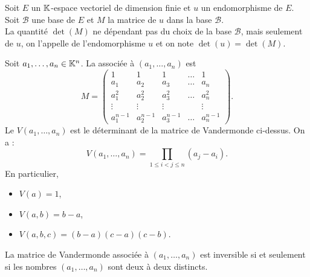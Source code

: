 \documentclass{book}
\begin{document}
\begin{Definition}
Soit $E$ un $\mathbb{K} $-espace vectoriel de dimension finie et $u$ un endomorphisme de $E$.\\
Soit $\mathcal{B}$ une base de $E$ et $M$ la matrice de $u$ dans la base $\mathcal{B}$.\\
La quantité $\det(M)$ ne dépendant pas du choix de la base $\mathcal{B}$, mais seulement de $u$, on l'appelle  de l'endomorphisme $u$ et on note $\det(u) = \det(M)$.
\end{Definition}
\begin{Exemple}

Soit $a_1,\dots,a_n \in  \mathbb{K} ^n$.
La  associée à $(a_1,\dots,a_n)$ est
\[ M = \begin{pmatrix}
    1 &  1 &  1 &  \dots &  1  \\
    a_1 &  a_2 &  a_3 &  \dots &  a_n  \\
    a_1^2 &  a_2^2 &  a_3^2 &  \dots &  a_n^2  \\
    \vdots &  \vdots &  \vdots &   &  \vdots  \\
a_1^{n-1} &  a_2^{n-1} &  a_3^{n-1} &  \dots &  a_n^{n-1}  \end{pmatrix}. \]
Le  $V(a_1,\dots,a_n)$ est le déterminant de la matrice de Vandermonde ci-dessus. On a :
$$V(a_1,\dots,a_n) = \prod_{1\leq i < j\leq n} (a_j - a_i). $$
En particulier,
\begin{itemize}
\item $V(a) = 1$,
\item $V(a,b) = b-a$,
\item $V(a,b,c) = (b-a)(c-a)(c-b)$.
\end{itemize}
La matrice de Vandermonde associée à $(a_1,\dots,a_n)$ est inversible si et seulement si les nombres $(a_1,\dots,a_n)$ sont deux à deux distincts.
\end{Exemple}
%
%
\end{document}
